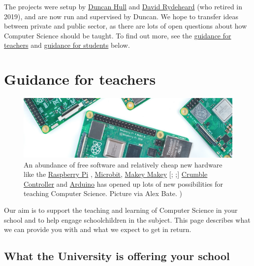 \documentclass[
  12pt,
]{book}
\begin{document}
The projects were setup by \protect\hyperlink{contact}{Duncan Hull} and \href{http://www.cs.man.ac.uk/~david/}{David Rydeheard} (who retired in 2019), and are now run and supervised by Duncan. We hope to transfer ideas between private and public sector, as there are lots of open questions about how Computer Science should be taught. \citep{cse, suemcr, stephenson, fincherpetre} To find out more, see the \protect\hyperlink{guidance-for-teachers}{guidance for teachers} and \protect\hyperlink{guidance-for-students}{guidance for students} below.

\hypertarget{guidance-for-teachers}{%
\section{Guidance for teachers}\label{guidance-for-teachers}}



\begin{figure}

{\centering \includegraphics[width=0.98\linewidth]{images/raspberrypi} 

}

\caption{An abundance of free software and relatively cheap new hardware like the \href{https://www.raspberrypi.org}{Raspberry Pi} \citep{raspberrypi}, \href{https://microbit.org}{Microbit}, \citep{Sentance2017} \href{https://makeymakey.com}{Makey Makey} {[}\citet{nevertooold}; \citet{makeymakey};{]} \href{https://redfernelectronics.co.uk/crumble/}{Crumble Controller} and \href{https://www.arduino.cc}{Arduino} \citep{arduino} has opened up lots of new possibilities for teaching Computer Science. Picture via Alex Bate. \citep{SnazzyRPi})}\label{fig:unnamed-chunk-7}
\end{figure}

Our aim is to support the teaching and learning of Computer Science in your school and to help engage schoolchildren in the subject. This page describes what we can provide you with and what we expect to get in return.

\hypertarget{what-the-university-is-offering-your-school}{%
\subsection{What the University is offering your school}\label{what-the-university-is-offering-your-school}}
\end{document}
